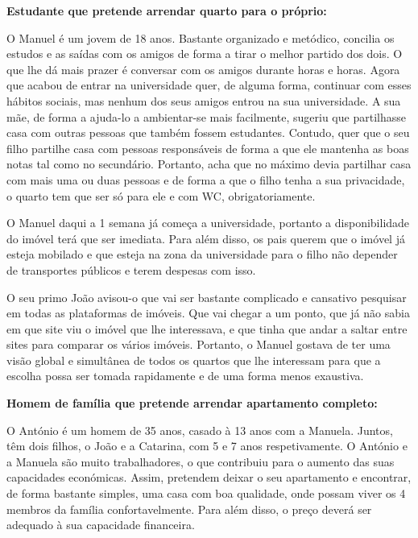 \vspace{0.4cm}
\noindent\textbf{Estudante que pretende arrendar quarto para o próprio:}

O Manuel é um jovem de 18 anos. Bastante organizado e metódico, concilia os estudos e as saídas com os amigos de forma a tirar o melhor partido dos dois. O que lhe dá mais prazer é conversar com os amigos  durante horas e horas. Agora que acabou de entrar na universidade quer, de alguma forma, continuar com esses hábitos sociais, mas nenhum dos seus amigos entrou na sua universidade. A sua mãe, de forma a ajuda-lo a ambientar-se mais facilmente, sugeriu que partilhasse casa com outras pessoas que também fossem estudantes. Contudo, quer que o seu filho partilhe casa com pessoas responsáveis de forma a que ele mantenha as boas notas tal como no secundário. Portanto, acha que no máximo devia partilhar casa com mais uma ou duas pessoas e de forma a que o filho tenha a sua privacidade, o quarto tem que ser só para ele e com WC, obrigatoriamente.

O Manuel daqui a 1 semana já começa a universidade, portanto a disponibilidade do imóvel terá que ser imediata. Para além disso, os pais querem que o imóvel já esteja mobilado e que esteja na zona da universidade para o filho não depender de transportes públicos e terem despesas com isso. 

O seu primo João avisou-o que vai ser bastante complicado e cansativo pesquisar em todas as plataformas de imóveis. Que vai chegar a um ponto, que já não sabia em que site viu o imóvel que lhe interessava, e que tinha que andar a saltar entre sites para comparar os vários imóveis. Portanto, o Manuel gostava de ter uma visão global e simultânea de todos os quartos que lhe interessam para que a escolha possa ser tomada rapidamente e de uma forma menos exaustiva.

\vspace{0.4cm}
\noindent\textbf{Homem de família que pretende arrendar apartamento completo:}

O António é um homem de 35 anos, casado à 13 anos com a Manuela. Juntos, têm dois filhos, o João e a Catarina, com 5 e 7 anos respetivamente. O António e a Manuela são muito trabalhadores, o que contribuiu para o aumento das suas capacidades económicas. Assim, pretendem deixar o seu apartamento e encontrar, de forma bastante simples, uma casa com boa qualidade, onde possam viver os 4 membros da família confortavelmente. Para além disso, o preço deverá ser adequado à sua capacidade financeira.

